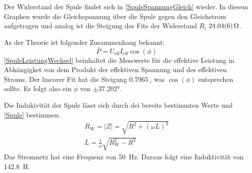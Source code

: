 \documentclass[
	a4paper,
	12pt,
	pagesize,
	ngerman
]{scrartcl}
\begin{document}
	Der Widerstand der Spule findet sich in \cref{SpuleSpannungGleich} wieder. 
	In diesem Graphen wurde die Gleichspannung über die Spule gegen den Gleichstrom aufgetragen und analog ist die Steigung des Fits der Widerstand $R_\text{i}$ $\SI{24,04 \pm 0,06}{\Omega}$.

	As der Theorie ist folgender Zusammenhang bekannt:
	\begin{equation}
		\bar{P} = U_\text{eff} I_\text{eff} \cos(\phi)
	\end{equation}
	\cref{SpuleLeistungWechsel} beinhaltet die Messwerte für die effektive Leistung in Abhängigket von dem Produkt der effektiven Spannung und des effektiven Stroms. 
	Der linearer Fit hat die Steigung $\SI{0,7965}{}$, was $\cos(\phi)$ entsprechen sollte. 
	Es folgt also ein $\phi$ von $\pm\ang{37,202}$.

	Die Indukivität der Spule lässt sich durch dei bereits bestimmten Werte und \cref{Spule} bestimmen.
	\begin{gather}
		\label{Spule}
		R_\text{W} = |Z| = \sqrt{R^2 + (\omega L)^2} \\
		L = \frac{1}{\omega}\sqrt{R_\text{W}^2-R^2}
	\end{gather}
		Das Stromnetz hat eine Frequenz von \SI{50}{Hz}. %
		Daraus folgt eine Induktivität von \SI{142,8}{H}. %
	
\end{document}
